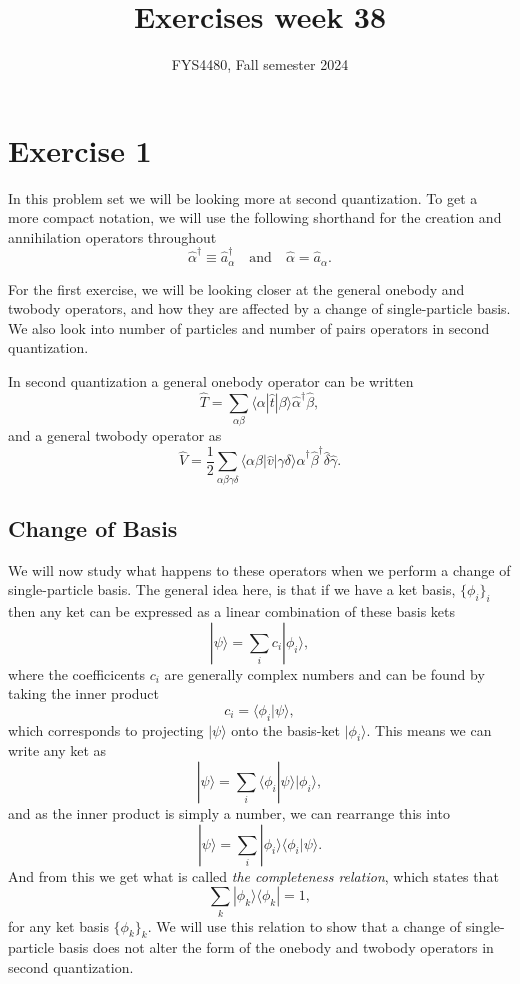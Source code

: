 \documentclass[a4paper, 11pt, notitlepage, english]{article}
\title{Exercises week 38}
\author{FYS4480, Fall semester 2024}
\newcommand{\bra}[1]{\langle #1|}
\newcommand{\ket}[1]{|#1 \rangle}
\newcommand{\braket}[2]{\langle #1 | #2 \rangle}
\newcommand{\op}[1]{\hat{#1}}
\newcommand{\braopket}[3]{\langle #1 | {#2} | #3 \rangle}
\newcommand{\ketbra}[2]{\ket{#1}\bra{#2}}
\begin{document}
\maketitle

\section*{Exercise 1}

In this problem set we will be looking more at second quantization. To get a more compact notation, we will use the following shorthand for the creation and annihilation operators throughout
$$\op{\alpha}^\dag \equiv \op{a}_\alpha^\dag \quad \mbox{and} \quad \op{\alpha} = \op{a}_\alpha.$$

For the first exercise, we will be looking closer at the general onebody and twobody operators, and how they are affected by a change of single-particle basis. We also look into number of particles and number of pairs operators in second quantization.

In second quantization a general onebody operator can be written
$$\op{T} = \sum_{\alpha\beta} \braopket{\alpha}{\op{t}}{\beta} \op{\alpha}^\dag \op{\beta},$$
and a general twobody operator as
$$\op{V} = \frac{1}{2}\sum_{\alpha\beta\gamma\delta} \braopket{\alpha\beta}{\op{v}}{\gamma\delta} \op{\alpha}^\dag \op{\beta}^\dag \op{\delta} \op{\gamma}.$$

\subsection*{Change of Basis}
We will now study what happens to these operators when we perform a change of single-particle basis. The general idea here, is that if we have a ket basis, $\{\phi_i\}_i$ then any ket can be expressed as a linear combination of these basis kets
$$\ket{\psi} = \sum_i c_i \ket{\phi_i},$$
where the coefficicents $c_i$ are generally complex numbers and can be found by taking the inner product 
$$c_i = \braket{\phi_i}{\psi},$$
which corresponds to projecting $\ket{\psi}$ onto the basis-ket $\ket{\phi_i}$. This means we can write any ket as
$$\ket{\psi} = \sum_i  \braket{\phi_i}{\psi}\ket{\phi_i},$$
and as the inner product is simply a number, we can rearrange this into
$$\ket{\psi} = \sum_i  \ket{\phi_i}\braket{\phi_i}{\psi}.$$
And from this we get what is called \emph{the completeness relation}, which states that 
$$\sum_k \ketbra{\phi_k}{\phi_k} = 1,$$
for any ket basis $\{\phi_k\}_k$. We will use this relation to show that a change of single-particle basis does not alter the form of the onebody and twobody operators in second quantization.
\end{document}
